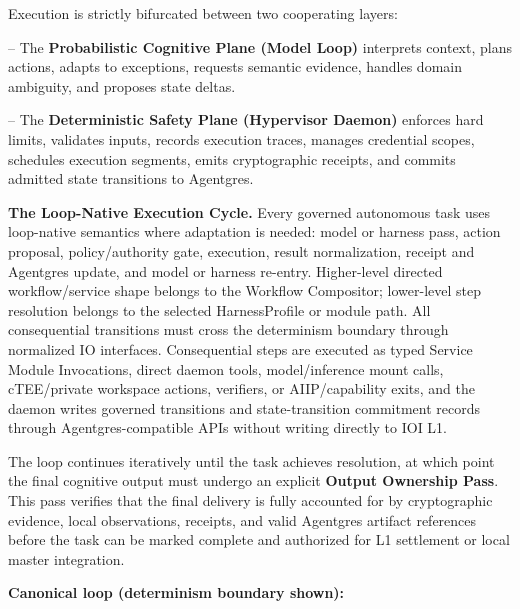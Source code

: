 \documentclass[
  11pt,
]{article}
\begin{document}
Execution is strictly bifurcated between two cooperating layers:

-- The \textbf{Probabilistic Cognitive Plane (Model Loop)} interprets
context, plans actions, adapts to exceptions, requests semantic
evidence, handles domain ambiguity, and proposes state deltas.

-- The \textbf{Deterministic Safety Plane (Hypervisor Daemon)} enforces
hard limits, validates inputs, records execution traces, manages
credential scopes, schedules execution segments, emits cryptographic
receipts, and commits admitted state transitions to Agentgres.

\textbf{The Loop-Native Execution Cycle.} Every governed autonomous task
uses loop-native semantics where adaptation is needed: model or harness
pass, action proposal, policy/authority gate, execution, result
normalization, receipt and Agentgres update, and model or harness
re-entry. Higher-level directed workflow/service shape belongs to the
Workflow Compositor; lower-level step resolution belongs to the selected
HarnessProfile or module path. All consequential transitions must cross
the determinism boundary through normalized IO interfaces. Consequential
steps are executed as typed Service Module Invocations, direct daemon
tools, model/inference mount calls, cTEE/private workspace actions,
verifiers, or AIIP/capability exits, and the daemon writes governed
transitions and state-transition commitment records through Agentgres-compatible
APIs without writing directly to IOI L1.

The loop continues iteratively until the task achieves resolution, at
which point the final cognitive output must undergo an explicit
\textbf{Output Ownership Pass}. This pass verifies that the final
delivery is fully accounted for by cryptographic evidence, local
observations, receipts, and valid Agentgres artifact references before
the task can be marked complete and authorized for L1 settlement or
local master integration.

\textbf{Canonical loop (determinism boundary shown):}
\end{document}
